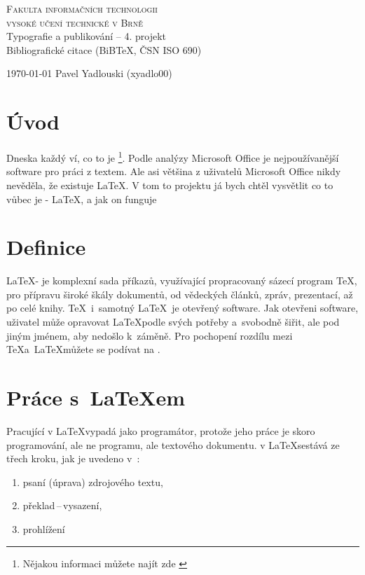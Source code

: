 \documentclass[11pt,a4paper]{article}
\begin{document}
\begin{titlepage}
    \begin{center}
        \textsc{\Huge Fakulta informačních technologii\\\vspace{0.4em}
        vysoké učení technické v Brně}\\
        {\LARGE Typografie a publikování -- 4. projekt\\\vspace{0.3em}
        Bibliografické citace (BiBTeX, ČSN ISO 690)}
    \end{center}
    \begin{flushleft}
        \today
        \hfill
        Pavel Yadlouski (xyadlo00)
    \end{flushleft}
\end{titlepage}

\newpage
\section*{Úvod}
	Dneska každý ví, co to je  \footnote{Nějakou informaci můžete najít zde \cite{Microsoft2010}}. Podle analýzy 	Microsoft Office je nejpoužívanější software pro práci z textem. Ale asi většina z uživatelů Microsoft Office nikdy nevěděla, že existuje \LaTeX. V tom to projektu já bych chtěl vysvětlit co to vůbec je - \LaTeX, a jak on funguje

\section{Definice}
\LaTeX - je komplexní sada příkazů, využívající propracovaný sázecí program \TeX, pro přípravu široké
škály dokumentů, od vědeckých článků, zpráv, prezentací, až po celé knihy. \TeX\ i~samotný \LaTeX\ je
otevřený software. Jak otevřeni software, uživatel může opravovat \LaTeX podle svých potřeby a~svobodně šiřit, ale pod jiným jménem, aby nedošlo k~záměně. Pro pochopení rozdílu mezi \TeX a~\LaTeX můžete se podívat na \cite{Kopkac}.



\section{Práce s~{\LaTeX}em}
Pracující v \LaTeX vypadá jako programátor, protože jeho práce je skoro programování, ale ne programu, ale textového dokumentu.  v \LaTeX sestává ze třech kroku, jak je uvedeno v~\cite{Rybicka}:
		\begin{enumerate}
			\item psaní (úprava) zdrojového textu,
			\item překlad\,--\,vysazení,
			\item prohlížení		
		\end{enumerate}
\end{document}
